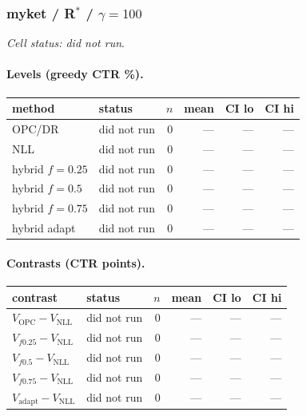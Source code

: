 \documentclass[10pt,a4paper]{article}
\begin{document}
\subsubsection{myket / R$^*$ / $\gamma=100$}
\emph{Cell status: did not run}.
\paragraph{Levels (greedy CTR \%).}
{\centering\small\begin{tabular}{llrrrr}
\toprule method & status & $n$ & mean & CI lo & CI hi \\
\midrule
OPC/DR & did not run & 0 & --- & --- & --- \\
NLL & did not run & 0 & --- & --- & --- \\
hybrid $f{=}0.25$ & did not run & 0 & --- & --- & --- \\
hybrid $f{=}0.5$ & did not run & 0 & --- & --- & --- \\
hybrid $f{=}0.75$ & did not run & 0 & --- & --- & --- \\
hybrid adapt & did not run & 0 & --- & --- & --- \\
\bottomrule\end{tabular}\par}
\paragraph{Contrasts (CTR points).}
{\centering\small\begin{tabular}{llrrrr}
\toprule contrast & status & $n$ & mean & CI lo & CI hi \\
\midrule
$V_{\mathrm{OPC}}-V_{\mathrm{NLL}}$ & did not run & 0 & --- & --- & --- \\
$V_{f0.25}-V_{\mathrm{NLL}}$ & did not run & 0 & --- & --- & --- \\
$V_{f0.5}-V_{\mathrm{NLL}}$ & did not run & 0 & --- & --- & --- \\
$V_{f0.75}-V_{\mathrm{NLL}}$ & did not run & 0 & --- & --- & --- \\
$V_{\mathrm{adapt}}-V_{\mathrm{NLL}}$ & did not run & 0 & --- & --- & --- \\
\bottomrule\end{tabular}\par}
\end{document}
